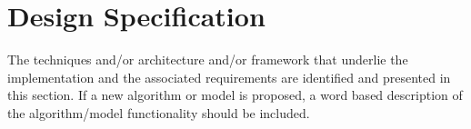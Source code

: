 
\section{Design Specification}
\label{sec:Design}

The techniques and/or architecture and/or framework that underlie the implementation and the associated requirements are identified and presented in this section. If a new algorithm or model is proposed, a word based description of the algorithm/model functionality should be included.
